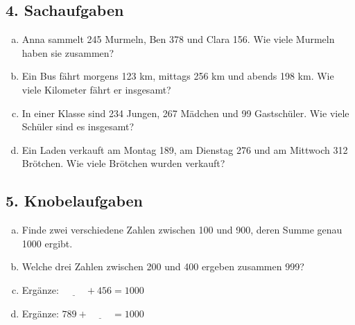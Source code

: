 \subsection*{4. Sachaufgaben}
\begin{enumerate}[a)]
    \item Anna sammelt 245 Murmeln, Ben 378 und Clara 156. Wie viele Murmeln haben sie zusammen?
    \item Ein Bus fährt morgens 123 km, mittags 256 km und abends 198 km. Wie viele Kilometer fährt er insgesamt?
    \item In einer Klasse sind 234 Jungen, 267 Mädchen und 99 Gastschüler. Wie viele Schüler sind es insgesamt?
    \item Ein Laden verkauft am Montag 189, am Dienstag 276 und am Mittwoch 312 Brötchen. Wie viele Brötchen wurden verkauft?
\end{enumerate}

\subsection*{5. Knobelaufgaben}
\begin{enumerate}[a)]
    \item Finde zwei verschiedene Zahlen zwischen 100 und 900, deren Summe genau 1000 ergibt.
    \item Welche drei Zahlen zwischen 200 und 400 ergeben zusammen 999?
    \item Ergänze: $\underline{\hspace{1cm}} + 456 = 1000$
    \item Ergänze: $789 + \underline{\hspace{1cm}} = 1000$
\end{enumerate}

